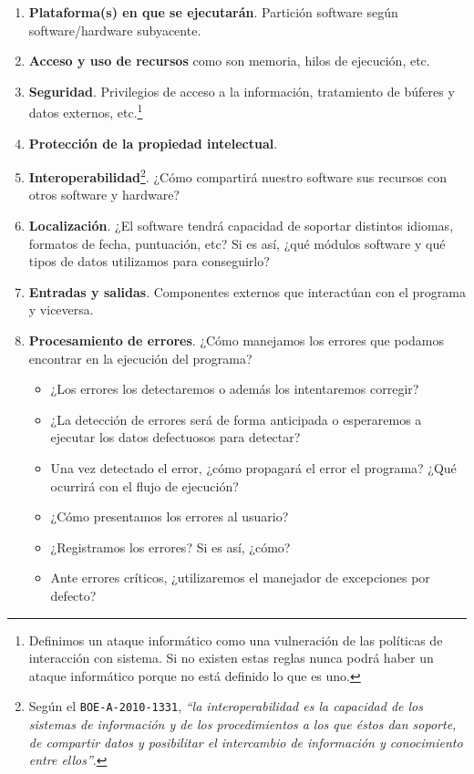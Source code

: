 \begin{enumerate}
    \item \textbf{Plataforma(s) en que se ejecutarán}. Partición software según software/hardware
          subyacente.
    \item \textbf{Acceso y uso de recursos} como son memoria, hilos de ejecución, etc.
    \item \textbf{Seguridad}. Privilegios de acceso a la información, tratamiento de búferes
          y datos externos, etc.\footnote{
            Definimos un ataque informático como una vulneración de las políticas de
            interacción con sistema. Si no existen estas reglas nunca podrá haber un
            ataque informático porque no está definido lo que es uno.
          }
        \item \textbf{Protección de la propiedad intelectual}. 
    \item \textbf{Interoperabilidad}\footnote{Según el \texttt{BOE-A-2010-1331}, \textit{``la interoperabilidad
          es la capacidad de los sistemas de información y de los procedimientos a los que éstos dan soporte,
          de compartir datos y posibilitar el intercambio de información y conocimiento entre ellos''}.}. ¿Cómo compartirá nuestro software sus recursos con otros
          software y hardware?
    \item \textbf{Localización}. ¿El software tendrá capacidad de soportar distintos
          idiomas, formatos de fecha, puntuación, etc? Si es así, ¿qué módulos software y qué
          tipos de datos utilizamos para conseguirlo?
    \item \textbf{Entradas y salidas}. Componentes externos que interactúan con el programa y viceversa.
    \item \textbf{Procesamiento de errores}. ¿Cómo manejamos los errores que podamos encontrar en 
          la ejecución del programa?
        \begin{itemize}
            \item ¿Los errores los detectaremos o además los intentaremos corregir?
            \item ¿La detección de errores será de forma anticipada o esperaremos a ejecutar
                  los datos defectuosos para detectar?
            \item Una vez detectado el error, ¿cómo propagará el error el programa? ¿Qué ocurrirá
                  con el flujo de ejecución?
            \item ¿Cómo presentamos los errores al usuario?
            \item ¿Registramos los errores? Si es así, ¿cómo?
            \item Ante errores críticos, ¿utilizaremos el manejador de excepciones por defecto?
        \end{itemize}
\end{enumerate}

